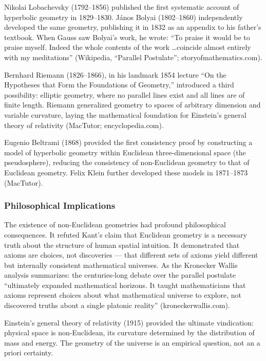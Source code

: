 \documentclass[11pt,letterpaper]{article}
\begin{document}
Nikolai Lobachevsky (1792--1856) published the first systematic account of hyperbolic geometry in 1829--1830. J\'{a}nos Bolyai (1802--1860) independently developed the same geometry, publishing it in 1832 as an appendix to his father's textbook. When Gauss saw Bolyai's work, he wrote: ``To praise it would be to praise myself. Indeed the whole contents of the work \ldots coincide almost entirely with my meditations'' (Wikipedia, ``Parallel Postulate''; storyofmathematics.com).

Bernhard Riemann (1826--1866), in his landmark 1854 lecture ``On the Hypotheses that Form the Foundations of Geometry,'' introduced a third possibility: elliptic geometry, where no parallel lines exist and all lines are of finite length. Riemann generalized geometry to spaces of arbitrary dimension and variable curvature, laying the mathematical foundation for Einstein's general theory of relativity (MacTutor; encyclopedia.com).

Eugenio Beltrami (1868) provided the first consistency proof by constructing a model of hyperbolic geometry within Euclidean three-dimensional space (the pseudosphere), reducing the consistency of non-Euclidean geometry to that of Euclidean geometry. Felix Klein further developed these models in 1871--1873 (MacTutor).

\subsubsection{Philosophical Implications}

The existence of non-Euclidean geometries had profound philosophical consequences. It refuted Kant's claim that Euclidean geometry is a necessary truth about the structure of human spatial intuition. It demonstrated that axioms are choices, not discoveries --- that different sets of axioms yield different but internally consistent mathematical universes. As the Kronecker Wallis analysis summarizes: the centuries-long debate over the parallel postulate ``ultimately expanded mathematical horizons. It taught mathematicians that axioms represent choices about what mathematical universe to explore, not discovered truths about a single platonic reality'' (kroneckerwallis.com).

Einstein's general theory of relativity (1915) provided the ultimate vindication: physical space is non-Euclidean, its curvature determined by the distribution of mass and energy. The geometry of the universe is an empirical question, not an a priori certainty.
\end{document}
